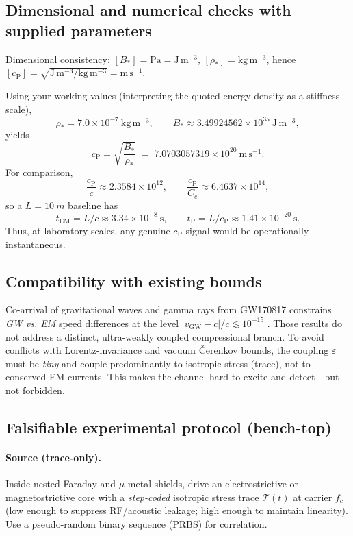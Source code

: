 \documentclass[12pt]{article}
\begin{document}
\subsection{Dimensional and numerical checks with supplied parameters}
Dimensional consistency: $[B_*]=\mathrm{Pa}=\mathrm{J\,m^{-3}}$, $[\rho_*]=\mathrm{kg\,m^{-3}}$, hence $[c_{\mathrm{P}}]=\sqrt{\mathrm{J\,m^{-3}}/\mathrm{kg\,m^{-3}}}=\mathrm{m\,s^{-1}}$.

Using your working values (interpreting the quoted energy density as a stiffness scale),
\[
\rho_* = 7.0\times 10^{-7}\ \mathrm{kg\,m^{-3}},\qquad
B_* \approx 3.49924562\times 10^{35}\ \mathrm{J\,m^{-3}},
\]
yields
\begin{equation}
c_{\mathrm{P}}=\sqrt{\frac{B_*}{\rho_*}}
\;=\; 7.0703057319\times 10^{20}\ \mathrm{m\,s^{-1}}.
\label{eq:cPnumber}
\end{equation}
For comparison,
\[
\frac{c_{\mathrm{P}}}{c}\approx 2.3584\times 10^{12},\qquad
\frac{c_{\mathrm{P}}}{C_e}\approx 6.4637\times 10^{14},
\]
so a $L=\SI{10}{m}$ baseline has
\[
t_{\mathrm{EM}}=L/c \approx 3.34\times 10^{-8}\ \mathrm{s},\qquad
t_{\mathrm{P}}=L/c_{\mathrm{P}} \approx 1.41\times 10^{-20}\ \mathrm{s}.
\]
Thus, at laboratory scales, any genuine $c_{\mathrm{P}}$ signal would be operationally instantaneous.

\subsection{Compatibility with existing bounds}
Co-arrival of gravitational waves and gamma rays from GW170817 constrains \emph{GW vs. EM} speed differences at the level $|v_{\mathrm{GW}}-c|/c\lesssim 10^{-15}$ \cite{Abbott2017PRL,Abbott2017ApJL}. Those results do not address a distinct, ultra-weakly coupled compressional branch. To avoid conflicts with Lorentz-invariance and vacuum Čerenkov bounds, the coupling $\varepsilon$ must be \emph{tiny} and couple predominantly to isotropic stress (trace), not to conserved EM currents. This makes the channel hard to excite and detect—but not forbidden.

\subsection{Falsifiable experimental protocol (bench-top)}
\paragraph{Source (trace-only).} Inside nested Faraday and $\mu$-metal shields, drive an electrostrictive or magnetostrictive core with a \emph{step-coded} isotropic stress trace $\mathcal{T}(t)$ at carrier $f_c$ (low enough to suppress RF/acoustic leakage; high enough to maintain linearity). Use a pseudo-random binary sequence (PRBS) for correlation.
\end{document}

